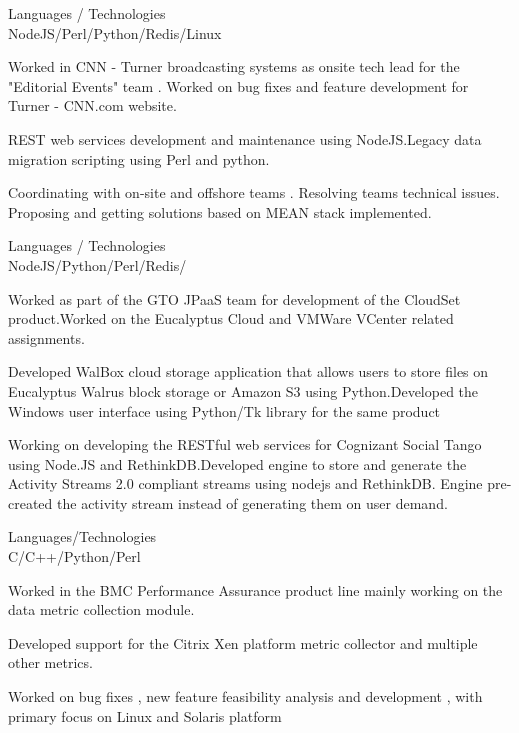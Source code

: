 \documentclass[a4,10pt]{cv4tw}
\begin{document}
{Languages / Technologies \\ NodeJS/Perl/Python/Redis/Linux}
	{ 
	\begin{missions}
		\item Worked in CNN - Turner broadcasting systems as onsite tech lead for the "Editorial Events" team . Worked on bug fixes and feature development for Turner - CNN.com website.
		\item REST web services development and maintenance using NodeJS.Legacy data migration scripting using Perl and python.
		\item Coordinating with on-site and offshore teams . Resolving teams technical issues. Proposing and getting solutions based on MEAN stack implemented.
	\end{missions}
}

{Languages / Technologies \\ NodeJS/Python/Perl/Redis/}
	{ 
	\begin{missions}
		\item Worked as part of the GTO JPaaS team for development of the CloudSet product.Worked on the Eucalyptus Cloud and VMWare VCenter related assignments.
		\item Developed WalBox cloud storage application that allows users to store files on Eucalyptus Walrus block storage or Amazon S3 using Python.Developed the Windows user interface using Python/Tk library for the same product
		\item Working on  developing the RESTful web services for Cognizant Social Tango using Node.JS and RethinkDB.Developed engine to store and generate the Activity Streams 2.0 compliant streams using nodejs and RethinkDB. Engine pre-created the activity stream instead of generating them on user demand.
	\end{missions}
}

{Languages/Technologies \\ C/C++/Python/Perl}
	{ 
	\begin{missions}	
		\item Worked  in the BMC Performance Assurance product line mainly working on the data metric collection module.
		\item Developed support for the Citrix Xen platform metric collector and multiple other metrics.
		\item Worked  on bug fixes , new feature feasibility analysis and development , with primary focus on Linux and Solaris platform		
	\end{missions}
}
\end{document}
